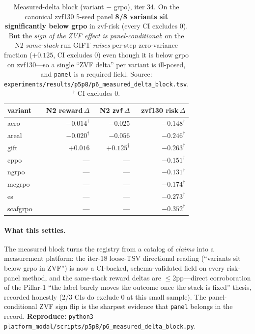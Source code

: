 \begin{table}[t]
\centering\small
\caption{Measured-delta block (variant $-$ grpo), iter 34. On the
canonical zvf130 5-seed panel \textbf{8/8 variants sit significantly
below grpo} in zvf-risk (every CI excludes 0). But the \emph{sign of the
ZVF effect is panel-conditional}: on the N2 \emph{same-stack} run GIFT
\emph{raises} per-step zero-variance fraction ($+0.125$, CI excludes 0)
even though it is below grpo on zvf130---so a single ``ZVF delta'' per
variant is ill-posed, and \texttt{panel} is a required field.
Source: \texttt{experiments/results/p5p8/p6\_measured\_delta\_block.tsv}.
$^{\dagger}$ CI excludes 0.}
\label{tab:p6-measured-delta}
\begin{tabular}{l r r r}
\toprule
variant & N2 reward\,$\Delta$ & N2 \texttt{zvf}\,$\Delta$ & zvf130 risk\,$\Delta$ \\
\midrule
aero     & $-0.014^{\dagger}$ & $-0.025$            & $-0.148^{\dagger}$ \\
areal    & $-0.020^{\dagger}$ & $-0.056$            & $-0.246^{\dagger}$ \\
gift     & $+0.016$           & $+0.125^{\dagger}$  & $-0.263^{\dagger}$ \\
cppo     & ---                & ---                 & $-0.151^{\dagger}$ \\
ngrpo    & ---                & ---                 & $-0.131^{\dagger}$ \\
mcgrpo   & ---                & ---                 & $-0.174^{\dagger}$ \\
es       & ---                & ---                 & $-0.273^{\dagger}$ \\
scafgrpo & ---                & ---                 & $-0.352^{\dagger}$ \\
\bottomrule
\end{tabular}
\end{table}

\paragraph{What this settles.} The measured block turns the registry from
a catalog of \emph{claims} into a measurement platform: the iter-18
loose-TSV directional reading (``variants sit below grpo in ZVF'') is now
a CI-backed, schema-validated field on every risk-panel method, and the
same-stack reward deltas are $\leq$2pp---direct corroboration of the
Pillar-1 ``the label barely moves the outcome once the stack is fixed''
thesis, recorded honestly (2/3 CIs do exclude 0 at this small sample).
The panel-conditional ZVF sign flip is the sharpest evidence that
\texttt{panel} belongs in the record. \textbf{Reproduce:}
\texttt{python3 platform_modal/scripts/p5p8/p6\_measured\_delta\_block.py}.

